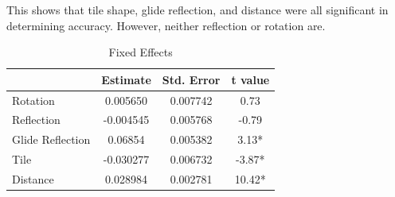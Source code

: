 This shows that tile shape, glide reflection, and distance were all significant in determining accuracy. However, neither reflection or rotation are.

\begin{table}
\centering
\begin{tabular}{|l|ccc|}
\hline
& Estimate & Std. Error & t value \\ \hline
Rotation& 0.005650& 0.007742& 0.73 \\ \hline
Reflection& -0.004545& 0.005768& -0.79 \\ \hline
Glide Reflection& 0.06854& 0.005382& 3.13* \\ \hline
Tile& -0.030277& 0.006732& -3.87* \\ \hline 
Distance& 0.028984& 0.002781& 10.42* \\ \hline
\end{tabular}
\label{results}
\caption{Fixed Effects}
\end{table}